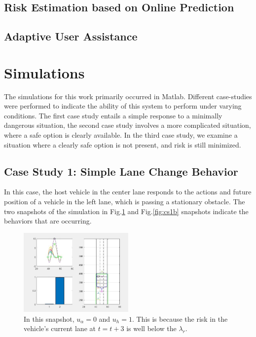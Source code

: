 \documentclass[conference]{IEEEtran}
\begin{document}
\subsection{Risk Estimation based on Online Prediction}



\subsection{Adaptive User Assistance}


 
 
 
	



\section{Simulations}
The simulations for this work primarily occurred in Matlab. Different case-studies were performed to indicate the ability of this system to perform under varying conditions. The first case study entails a simple response to a minimally dangerous situation, the second case study involves a more complicated situation, where a safe option is clearly available. In the third case study, we examine a situation where a clearly safe option is not present, and risk is still minimized.
\subsection{Case Study 1: Simple Lane Change Behavior}
In this case, the host vehicle in the center lane responds to the actions and future position of a vehicle in the left lane, which is passing a stationary obstacle. The two snapshots of the simulation in Fig.\ref{fig:cs1} and Fig.\ref{fig:cs1b} snapshots indicate the behaviors that are occurring.

\begin{figure}[ht]
    \includegraphics[width=0.5\textwidth]{cs1.JPG}
    \caption{In this snapshot, $u_{\alpha} = 0$ and $u_{h} = 1$. This is because the risk in the vehicle's current lane at $t = t+3$ is well below the $\lambda_{r}$.}
    \label{fig:cs1}
\end{figure}
\end{document}
